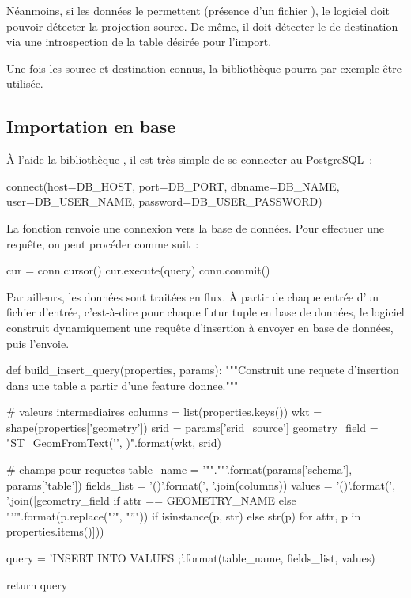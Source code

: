Néanmoins, si les données le permettent (présence d'un fichier ), le logiciel doit pouvoir détecter la projection source. De même, il doit détecter le  de destination via une introspection de la table désirée pour l'import.

Une fois les  source et destination connus, la bibliothèque  pourra par exemple être utilisée.

  \subsection{Importation en base}

À l'aide la bibliothèque , il est très simple de se connecter au  PostgreSQL~:

\begin{Code}
  connect(host=DB_HOST, port=DB_PORT, dbname=DB_NAME, user=DB_USER_NAME, password=DB_USER_PASSWORD)
\end{Code}

La fonction  renvoie une connexion vers la base de données. Pour effectuer une requête, on peut procéder comme suit~:

\begin{Code}
  cur = conn.cursor()
  cur.execute(query)
  conn.commit()
\end{Code}

Par ailleurs, les données sont traitées en flux. À partir de chaque entrée d'un fichier d'entrée, c'est-à-dire pour chaque futur tuple en base de données, le logiciel construit dynamiquement une requête d'insertion à envoyer en base de données, puis l'envoie.

\begin{Code}
  def build_insert_query(properties, params):
      """Construit une requete d'insertion dans une table a partir d'une feature donnee."""

      # valeurs intermediaires
      columns = list(properties.keys())
      wkt = shape(properties['geometry'])
      srid = params['srid_source']
      geometry_field = "ST_GeomFromText('{}', {})".format(wkt, srid)

      # champs pour requetes
      table_name = '"{}"."{}"'.format(params['schema'], params['table'])
      fields_list = '({})'.format(', '.join(columns))
      values = '({})'.format(', '.join([geometry_field if attr == GEOMETRY_NAME else "'{}'".format(p.replace("'", "''")) if isinstance(p, str) else str(p) for attr, p in properties.items()]))

      query = 'INSERT INTO {} {} VALUES {};'.format(table_name, fields_list, values)

      return query
\end{Code}

